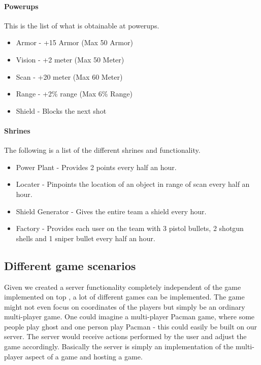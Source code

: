 \paragraph{Powerups}
This is the list of what is obtainable at powerups.
\begin{itemize}
\item Armor - +15 Armor (Max 50 Armor)
\item Vision - +2 meter (Max 50 Meter)
\item Scan - +20 meter (Max 60 Meter)
\item Range - +2\% range (Max 6\% Range)
\item Shield - Blocks the next shot
\end{itemize}

\paragraph{Shrines}
The following is a list of the different shrines and functionality.
\begin{itemize}
\item Power Plant - Provides 2 points every half an hour.
\item Locater - Pinpoints the location of an object in range of scan every half an hour.
\item Shield Generator - Gives the entire team a shield every hour.
\item Factory - Provides each user on the team with 3 pistol bullets, 2 shotgun shells and 1 sniper bullet every half an hour.
\end{itemize}

\subsection{Different game scenarios}\label{subsec:game-scenarios}
Given we created a server functionality completely independent of the game implemented on top , a lot of different games can be implemented. The game might not even focus on coordinates of the players but simply be an ordinary multi-player game. One could imagine a multi-player Pacman game, where some people play ghost and one person play Pacman - this could easily be built on our server. The server would receive actions performed by the user and adjust the game accordingly.
Basically the server is simply an implementation of the multi-player aspect of a game and hosting a game. 


